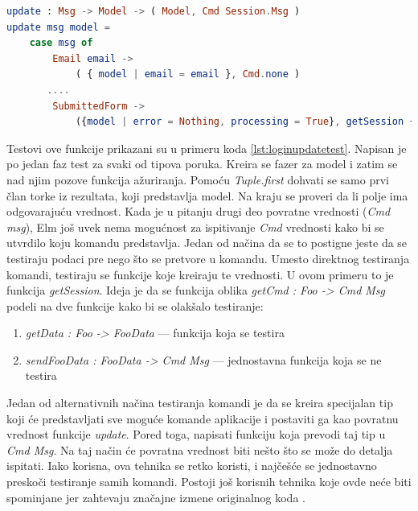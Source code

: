\documentclass[12pt,oneside]{memoir}
\begin{document}
\begin{lstlisting}[language=elm, caption={Funkcija \emph{update} stranice za prijavljivanje korisnika \emph{LoginPage}},captionpos=b, label={lst:loginupdate}]
update : Msg -> Model -> ( Model, Cmd Session.Msg )
update msg model =
    case msg of
        Email email ->
            ( { model | email = email }, Cmd.none )
       .... 
        SubmittedForm ->
            ({model | error = Nothing, processing = True}, getSession {email = model.email, password = model.password, apiBaseUrl = model.apiBaseUrl})
\end{lstlisting}

\par Testovi ove funkcije prikazani su u primeru koda \ref{lst:loginupdatetest}. Napisan je po jedan faz test za svaki od tipova poruka. Kreira se fazer za model i zatim se nad njim pozove funkcija ažuriranja. Pomoću \emph{Tuple.first} dohvati se samo prvi član torke iz rezultata, koji predstavlja model. Na kraju se proveri da li polje ima odgovarajuću vrednost. Kada je u pitanju drugi deo povratne vrednosti (\emph{Cmd msg}), Elm još uvek nema mogućnost za ispitivanje \emph{Cmd} vrednosti kako bi se utvrdilo koju komandu predstavlja. Jedan od načina da se to postigne jeste da se testiraju podaci pre nego što se pretvore u komandu. Umesto direktnog testiranja komandi, testiraju se funkcije koje kreiraju te vrednosti. U ovom primeru to je funkcija \emph{getSession}. Ideja je da se funkcija oblika \emph{getCmd : Foo -> Cmd Msg} podeli na dve funkcije kako bi se olakšalo testiranje: 

\begin{enumerate}
\item \emph{getData : Foo -> FooData} --- funkcija koja se testira
\item \emph{sendFooData : FooData -> Cmd Msg} --- jednostavna funkcija koja se ne testira 
\end{enumerate}

\par Jedan od alternativnih načina testiranja komandi je da se kreira specijalan tip koji će predstavljati sve moguće komande aplikacije i postaviti ga kao povratnu vrednost funkcije \emph{update}. Pored toga, napisati funkciju koja prevodi taj tip u \emph{Cmd Msg}. Na taj način će povratna vrednost biti nešto što se može do detalja ispitati. Iako korisna, ova tehnika se retko koristi, i najčešće se jednostavno preskoči testiranje samih komandi. Postoji još korisnih tehnika koje ovde neće biti spominjane jer zahtevaju značajne izmene originalnog koda \cite{cmd1, cmd2}. 
\end{document}
